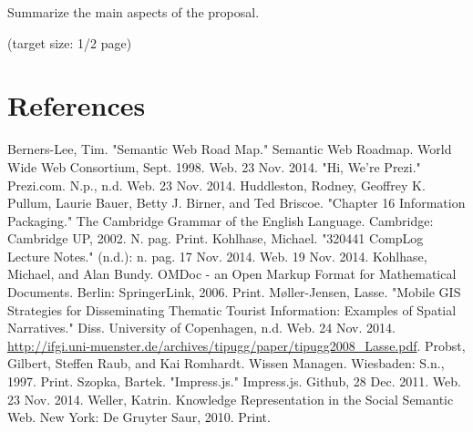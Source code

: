 \documentclass[twoside]{article}
\begin{document}
  Summarize the main aspects of the proposal.

  (target size: 1/2 page)

\newpage
\section{References}
\begin{thebibliography}{} %

Berners-Lee, Tim. "Semantic Web Road Map." Semantic Web Roadmap. World Wide Web Consortium, Sept. 1998. Web. 23 Nov. 2014.
"Hi, We're Prezi." Prezi.com. N.p., n.d. Web. 23 Nov. 2014.
Huddleston, Rodney, Geoffrey K. Pullum, Laurie Bauer, Betty J. Birner, and Ted Briscoe. "Chapter 16 Information Packaging." The Cambridge Grammar of the English Language. Cambridge: Cambridge UP, 2002. N. pag. Print.
Kohlhase, Michael. "320441 CompLog Lecture Notes." (n.d.): n. pag. 17 Nov. 2014. Web. 19 Nov. 2014.
Kohlhase, Michael, and Alan Bundy. OMDoc - an Open Markup Format for Mathematical Documents. Berlin: SpringerLink, 2006. Print.
M{\o}ller-Jensen, Lasse. "Mobile GIS Strategies for Disseminating Thematic Tourist Information: Examples of Spatial Narratives." Diss. University of Copenhagen, n.d. Web. 24 Nov. 2014. \href{http://ifgi.uni-muenster.de/archives/tipugg/paper/tipugg2008_Lasse.pdf}{http://ifgi.uni-muenster.de/archives/tipugg/paper/tipugg2008\_Lasse.pdf}.
Probst, Gilbert, Steffen Raub, and Kai Romhardt. \newblock Wissen Managen. \newblock Wiesbaden: S.n., 1997. Print.
Szopka, Bartek. "Impress.js." Impress.js. Github, 28 Dec. 2011. Web. 23 Nov. 2014.
Weller, Katrin. Knowledge Representation in the Social Semantic Web. New York: De Gruyter Saur, 2010. Print.
\end{thebibliography}

\end{document}
